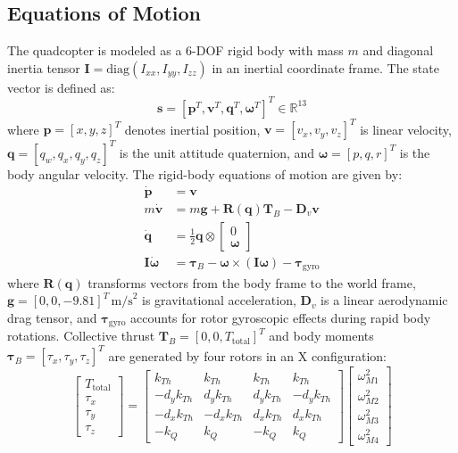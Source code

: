 \documentclass[11pt,a4paper]{article}
\begin{document}
\subsection{Equations of Motion}
The quadcopter is modeled as a 6-DOF rigid body with mass $m$ and diagonal inertia tensor $\mathbf{I} = \text{diag}(I_{xx}, I_{yy}, I_{zz})$ in an inertial coordinate frame. The state vector is defined as:
\begin{equation}
  \mathbf{s} = [\mathbf{p}^T, \mathbf{v}^T, \mathbf{q}^T, \boldsymbol{\omega}^T]^T \in \mathbb{R}^{13}
\end{equation}
where $\mathbf{p} = [x, y, z]^T$ denotes inertial position, $\mathbf{v} = [v_x, v_y, v_z]^T$ is linear velocity, $\mathbf{q} = [q_w, q_x, q_y, q_z]^T$ is the unit attitude quaternion, and $\boldsymbol{\omega} = [p, q, r]^T$ is the body angular velocity. The rigid-body equations of motion are given by:
\begin{align}
  \dot{\mathbf{p}} &= \mathbf{v} \label{eq:pos_dot} \\
  m \dot{\mathbf{v}} &= m \mathbf{g} + \mathbf{R}(\mathbf{q}) \mathbf{T}_B - \mathbf{D}_v \mathbf{v} \label{eq:vel_dot} \\
  \dot{\mathbf{q}} &= \frac{1}{2} \mathbf{q} \otimes \begin{bmatrix} 0 \\ \boldsymbol{\omega} \end{bmatrix} \label{eq:quat_dot} \\
  \mathbf{I} \dot{\boldsymbol{\omega}} &= \boldsymbol{\tau}_B - \boldsymbol{\omega} \times (\mathbf{I} \boldsymbol{\omega}) - \boldsymbol{\tau}_{\text{gyro}} \label{eq:omega_dot}
\end{align}
where $\mathbf{R}(\mathbf{q})$ transforms vectors from the body frame to the world frame, $\mathbf{g} = [0, 0, -9.81]^T\,\text{m/s}^2$ is gravitational acceleration, $\mathbf{D}_v$ is a linear aerodynamic drag tensor, and $\boldsymbol{\tau}_{\text{gyro}}$ accounts for rotor gyroscopic effects during rapid body rotations. Collective thrust $\mathbf{T}_B = [0, 0, T_{\text{total}}]^T$ and body moments $\boldsymbol{\tau}_B = [\tau_x, \tau_y, \tau_z]^T$ are generated by four rotors in an X configuration:
\begin{equation}
  \begin{bmatrix} T_{\text{total}} \\ \tau_x \\ \tau_y \\ \tau_z \end{bmatrix} =
  \begin{bmatrix}
    k_{Th} & k_{Th} & k_{Th} & k_{Th} \\
    -d_y k_{Th} & d_y k_{Th} & d_y k_{Th} & -d_y k_{Th} \\
    -d_x k_{Th} & -d_x k_{Th} & d_x k_{Th} & d_x k_{Th} \\
    -k_Q & k_Q & -k_Q & k_Q
  \end{bmatrix}
  \begin{bmatrix} \omega_{M1}^2 \\ \omega_{M2}^2 \\ \omega_{M3}^2 \\ \omega_{M4}^2 \end{bmatrix}
\end{equation}
\end{document}

